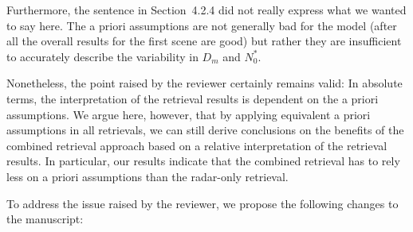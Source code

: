 \documentclass[11pt]{scrartcl}
\begin{document}
Furthermore, the sentence in Section~4.2.4 did not really express what we wanted
to say here. The a priori assumptions are not generally bad for the model
(after all the overall results for the first scene are good) but rather they are
insufficient to accurately describe the variability in $D_m$ and $N_0^*$.

Nonetheless, the point raised by the reviewer certainly remains valid: In
absolute terms, the interpretation of the retrieval results is dependent on the
a priori assumptions. We argue here, however, that by applying equivalent a
priori assumptions in all retrievals, we can still derive conclusions on the
benefits of the combined retrieval approach based on a relative interpretation
of the retrieval results. In particular, our results indicate that the combined
retrieval has to rely less on a priori assumptions than the radar-only
retrieval.

To address the issue raised by the reviewer, we propose the following
changes to the manuscript:
\end{document}
